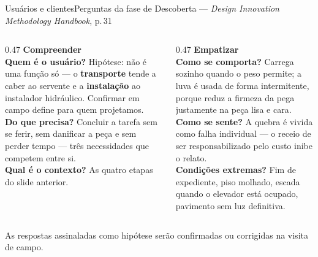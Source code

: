\documentclass[aspectratio=169,11pt]{beamer}
\begin{document}
\begin{frame}{Usuários e clientes}{Perguntas da fase de Descoberta — \textit{Design Innovation Methodology Handbook}, p.\,31}
  \vspace{0.4em}
  \begin{columns}[T,onlytextwidth]
    \begin{column}{0.47\textwidth}
      {\color{unbazul}\bfseries\small Compreender}\\[0.6em]
      {\footnotesize
      \textbf{Quem é o usuário?} Hipótese: não é uma função só — o \textbf{transporte}
      tende a caber ao servente e a \textbf{instalação} ao instalador hidráulico.
      Confirmar em campo define para quem projetamos.\\[0.5em]
      \textbf{Do que precisa?} Concluir a tarefa sem se ferir, sem danificar a peça
      e sem perder tempo — três necessidades que competem entre si.\\[0.5em]
      \textbf{Qual é o contexto?} As quatro etapas do slide anterior.}
    \end{column}
    \begin{column}{0.47\textwidth}
      {\color{unbverde}\bfseries\small Empatizar}\\[0.6em]
      {\footnotesize
      \textbf{Como se comporta?} Carrega sozinho quando o peso permite; a luva é
      usada de forma intermitente, porque reduz a firmeza da pega justamente na
      peça lisa e cara.\\[0.5em]
      \textbf{Como se sente?} A quebra é vivida como falha individual — o receio de
      ser responsabilizado pelo custo inibe o relato.\\[0.5em]
      \textbf{Condições extremas?} Fim de expediente, piso molhado, escada quando o
      elevador está ocupado, pavimento sem luz definitiva.}
    \end{column}
  \end{columns}
  \vspace{0.7em}
  {\scriptsize\color{cinza} As respostas assinaladas como hipótese serão confirmadas
   ou corrigidas na visita de campo.}
\end{frame}
\end{document}
